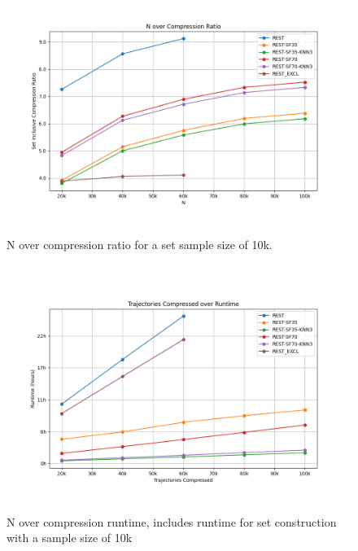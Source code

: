 \begin{figure}[ht]
    \begin{minipage}{0.99\linewidth}
        \centering
        \includegraphics[height=8cm, keepaspectratio]{./figures/n_compression.png}
        \caption{N over compression ratio for a set sample size of 10k.}
        \label{fig:n_compression}
    \end{minipage}
\end{figure}
\begin{figure}[h!]
    \begin{minipage}{0.99\linewidth}
        \centering
        \includegraphics[height=8cm, keepaspectratio]{./figures/n_runtime.png}
        \caption{N over compression runtime, includes runtime for set construction with a sample size of 10k}
        \label{fig:n_runtime}
    \end{minipage}
\end{figure}

